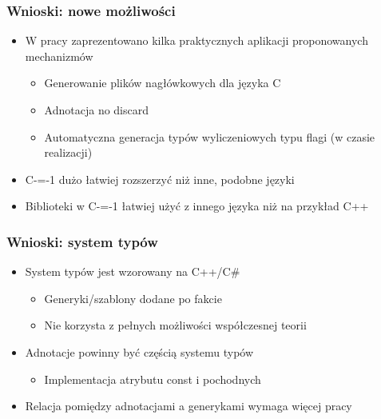 \begin{frame}
	\frametitle{Wnioski: nowe możliwości}

	\begin{itemize}
		\item W pracy zaprezentowano kilka praktycznych aplikacji proponowanych mechanizmów\begin{itemize}
			\item Generowanie plików nagłówkowych dla języka C
			\item Adnotacja no discard
			\item Automatyczna generacja typów wyliczeniowych typu flagi (w czasie realizacji)
		\end{itemize}
		\item C-=-1 dużo łatwiej rozszerzyć niż inne, podobne języki
		\item Biblioteki w C-=-1 łatwiej użyć z innego języka niż na przykład C++
	\end{itemize}

\end{frame}

\begin{frame}
	\frametitle{Wnioski: system typów}

	\begin{itemize}
		\item System typów jest wzorowany na C++/C\#\begin{itemize}
			\item Generyki/szablony dodane po fakcie
			\item Nie korzysta z pełnych możliwości współczesnej teorii
		\end{itemize}
		\item Adnotacje powinny być częścią systemu typów\begin{itemize}
			\item Implementacja atrybutu const i pochodnych
		\end{itemize}
		\item Relacja pomiędzy adnotacjami a generykami wymaga więcej pracy
	\end{itemize}

\end{frame}

